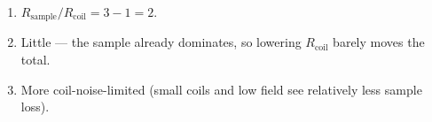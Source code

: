 \begin{enumerate}[leftmargin=1.6em,itemsep=2pt]
\item $R_{\text{sample}}/R_{\text{coil}} = 3 - 1 = 2$.
\item Little --- the sample already dominates, so lowering $R_{\text{coil}}$ barely moves the total.
\item More coil-noise-limited (small coils and low field see relatively less sample loss).
\end{enumerate}
